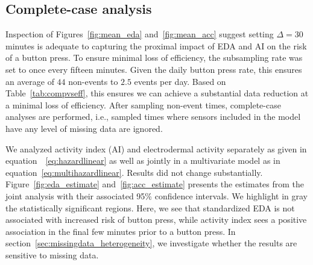 \documentclass[12pt]{amsart}
\begin{document}
\subsection{Complete-case analysis}

Inspection of Figures~\ref{fig:mean_eda} and~\ref{fig:mean_acc} suggest setting $\Delta = 30$ minutes is adequate to capturing the proximal impact of EDA and AI on the risk of a button press.  To ensure minimal loss of efficiency, the subsampling rate was set to once every fifteen minutes.  Given the daily button press rate, this ensures an average of $44$ non-events to $2.5$ events per day.  Based on Table~\ref{tab:compvseff}, this ensures we can achieve a substantial data reduction at a minimal loss of efficiency.  After sampling non-event times, complete-case analyses are performed, i.e., sampled times where sensors included in the model have any level of missing data are ignored.

We analyzed activity index (AI) and electrodermal activity separately as given in equation~~\eqref{eq:hazardlinear} as well as jointly in a multivariate model as in equation~\eqref{eq:multihazardlinear}.  Results did not change substantially.  Figure~\ref{fig:eda_estimate} and~\ref{fig:acc_estimate} presents the estimates from the joint analysis with their associated 95\% confidence intervals.  We highlight in gray the statistically significant regions.  Here, we see that standardized EDA is not associated with increased risk of button press, while activity index sees a positive association in the final few minutes prior to a button press.  In section~\ref{sec:missingdata_heterogeneity}, we investigate whether the results are sensitive to missing data.
\end{document}

